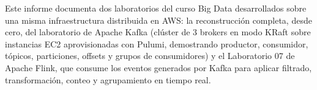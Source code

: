 \documentclass[
	spanish, %
	letterpaper, oneside
]{article}
\begin{document}
\templatePortrait

\templatePagecfg

\begin{abstractd}
	Este informe documenta dos laboratorios del curso Big Data desarrollados sobre una misma infraestructura distribuida en AWS: la reconstrucción completa, desde cero, del laboratorio de Apache Kafka (clúster de 3 brokers en modo KRaft sobre instancias EC2 aprovisionadas con Pulumi, demostrando productor, consumidor, tópicos, particiones, offsets y grupos de consumidores) y el Laboratorio 07 de Apache Flink, que consume los eventos generados por Kafka para aplicar filtrado, transformación, conteo y agrupamiento en tiempo real. %
\end{abstractd}

\templateIndex

\templateFinalcfg


% 


\end{document}
